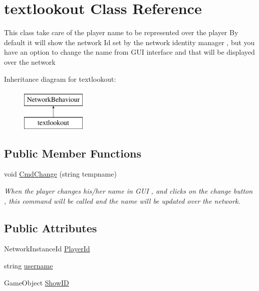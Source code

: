 \hypertarget{classtextlookout}{}\section{textlookout Class Reference}
\label{classtextlookout}


This class take care of the player name to be represented over the player By default it will show the network Id set by the network identity manager , but you have an option to change the name from G\+UI interface and that will be displayed over the network  


Inheritance diagram for textlookout\+:\begin{figure}[H]
\begin{center}
\leavevmode
\includegraphics[height=2.000000cm]{classtextlookout}
\end{center}
\end{figure}
\subsection*{Public Member Functions}
\begin{DoxyCompactItemize}
\item 
void \mbox{\hyperlink{classtextlookout_a87df2200dcf8cff836c4dac438d103a9}{Cmd\+Change}} (string tempname)
\begin{DoxyCompactList}\small\item\em When the player changes his/her name in G\+UI , and clicks on the change button , this command will be called and the name will be updated over the network. \end{DoxyCompactList}\end{DoxyCompactItemize}
\subsection*{Public Attributes}
\begin{DoxyCompactItemize}
\item 
Network\+Instance\+Id \mbox{\hyperlink{classtextlookout_a09639adaa974a89468fab81266391bfd}{Player\+Id}}
\item 
string \mbox{\hyperlink{classtextlookout_af0ca4bb5aa12ae3fc8dac76ad15460de}{username}}
\item 
Game\+Object \mbox{\hyperlink{classtextlookout_abacc824a1723ee526ca9eb4258ba1b4e}{Show\+ID}}
\end{DoxyCompactItemize}


